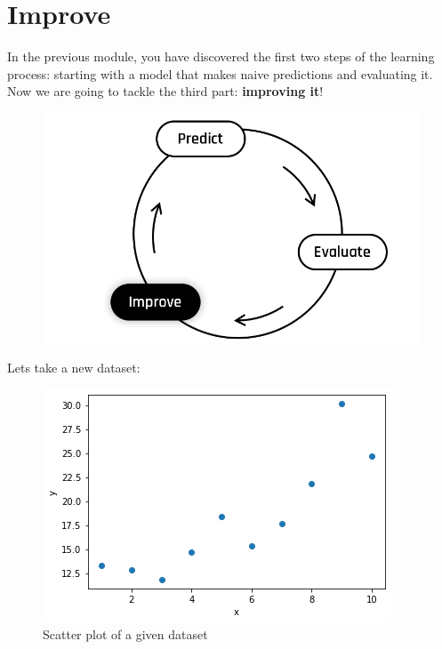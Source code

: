 
\section*{Improve}
In the previous module, you have discovered the first two steps of the learning process:
starting with a model that makes naive predictions and evaluating it.\\
Now we are going to tackle the third part:  \textbf{improving it}!
\begin{figure}[!h]
  \centering
  \includegraphics[scale=0.25]{assets/Improve2.png}
\end{figure}
\newline
Lets take a new dataset:
\begin{figure}[!h]
  \centering
  \includegraphics[scale=0.6]{assets/ex03_interlude_plot.png}
  \caption{Scatter plot of a given dataset}
\end{figure}

